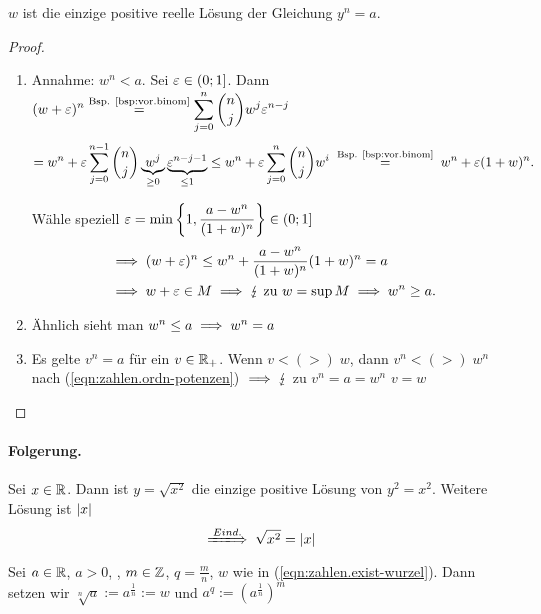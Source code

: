 \documentclass[12pt]{scrreprt}
\begin{document}
\begin{lem}\label{lem:zahlen.wurzel}
$w$ ist die einzige positive reelle Lösung der Gleichung $y^n = a$.
\end{lem}
\begin{proof}
\begin{enumerate}
\item Annahme: $w^n<a$. Sei $\varepsilon \in (0;1]$. Dann $\displaystyle(w+\varepsilon)^n \stackrel{\text{Bsp. \ref{bsp:vor.binom}}}{=} \sum^n_{j=0}\binom{n}{j}w^j\varepsilon^{n-j}$
\[= w^n+ \ep \sum^{n-1}_{j=0}\binom{n}{j}\underbrace{w^j}_{\ge 0}\underbrace{\ep^{n-j-1}}_{\le1}
\le w^n + \ep \sum^n_{j=0}\binom{n}{j}w^i \nach{=}{\text{Bsp. \ref{bsp:vor.binom}}} w^n + \ep (1+w)^n.\]

Wähle speziell $\displaystyle\varepsilon= \min \left\{1,\frac{a-w^n}{(1+w)^n}\right\} \in (0;1]$
\begin{align}
&\implies (w+\varepsilon)^n \le w^n +\frac{a-w^n}{(1+w)^n} (1+w)^n=a\nonumber\\
&\implies w+ \varepsilon \in M \implies \lightning\ \text{zu\ } w=\sup  M \implies w^n \ge a.\nonumber
\end{align}
\item Ähnlich sieht man $w^n \le a \implies w^n = a$
\item Es gelte $v^n=a$ für ein $v \in \mathbb{R}_+$. Wenn $v<(>)\;w$, dann $v^n <(>)\;w^n$ nach (\ref{eqn:zahlen.ordn-potenzen}) $\implies \lightning$
zu $v^n = a = w^n$ \folgt $v=w$
\end{enumerate}
\end{proof}

\paragraph{Folgerung.}
Sei $x \in \mathbb{R}$. Dann ist $y = \sqrt{x^2}$ die einzige positive Lösung von $y^2 = x^2$. Weitere Lösung ist $\left\lvert x\right\lvert$
\begin{equation}
\folgtwegen{Eind.}\sqrt{x^2} = \abs{x}
\label{eqn:zahlen.betrag-wurzel}
\end{equation}
\begin{dfn}\label{dfn:zahlen.wurzel}
Sei $a \in \mathbb{R}$, $a > 0$, , $m \in \mathbb{Z}$, $q=\frac{m}{n}$, $w$ wie in (\ref{eqn:zahlen.exist-wurzel}).
Dann setzen wir $\sqrt[n]{a} := a^{\frac{1}{n}} := w$ und $a^q:=(a^{\frac{1}{n}})^m$
\end{dfn}
\end{document}
